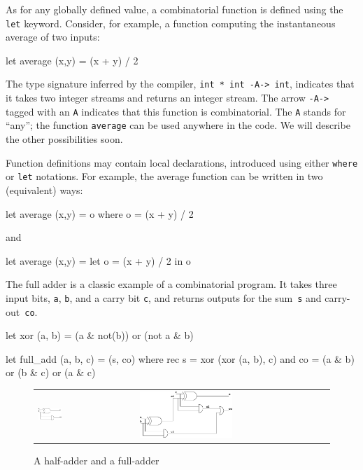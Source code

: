 \documentclass[11pt,titlepage,twoside]{report}
\newcommand{\zls}[1]{\texttt{#1}}
\newcommand{\zlsmsg}[1]{\texttt{#1}}
\begin{document}
As for any globally defined value, a combinatorial function
is defined using the \zls{let} keyword.
Consider, for example, a function computing the
instantaneous average of two inputs:
\begin{runverbatim}[withresult]
let average (x,y) = (x + y) / 2
\end{runverbatim}
The type signature inferred by the compiler, \zlsmsg{int * int -A-> int},
indicates that it takes two integer streams and returns an integer stream.
The arrow \texttt{-A->} tagged with an \texttt{A} indicates that this 
function is combinatorial.
The \texttt{A} stands for ``any''; the function \texttt{average} can be used 
anywhere in the code.
We will describe the other possibilities soon.

Function definitions may contain local declarations, introduced using
either \zls{where} or \zls{let} notations. For example, the average function 
can be written in two (equivalent) ways:
\begin{runverbatim}
let average (x,y) = o where o = (x + y) / 2
\end{runverbatim}
and
\begin{runverbatim}
let average (x,y) = let o = (x + y) / 2 in o
\end{runverbatim}

The full adder is a classic example of a combinatorial program.
It takes three input bits, \zls{a}, \zls{b}, and a carry bit \zls{c}, and 
returns outputs for the sum~\zls{s} and carry-out~\zls{co}.
\begin{runverbatim}[withresult,label=xor]
let xor (a, b) = (a & not(b)) or (not a & b)

let full_add (a, b, c) = (s, co) where
   rec s = xor (xor (a, b), c)
   and co = (a & b) or (b & c) or (a & c)
\end{runverbatim}

\begin{figure}
\begin{center}
\begin{tabular}{ll}
\includegraphics[width=0.25\textwidth]{Fig/half_adder}
& \quad\quad
\includegraphics[width=0.5\textwidth]{Fig/full_adder}
\end{tabular}
\end{center}
\caption{A half-adder and a full-adder~\label{half-adder}}
\end{figure}
\end{document}
